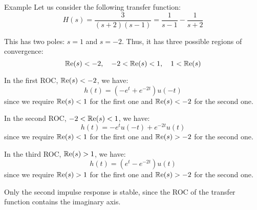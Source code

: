 \documentclass[a4paper]{article}
\begin{document}
\begin{parag}{Example}
    Let us consider the following transfer function: 
    \[H\left(s\right) = \frac{3}{\left(s+2\right)\left(s-1\right)} = \frac{1}{s-1} - \frac{1}{s+2}\]
    
    This has two poles: $s = 1$ and $s = -2$. Thus, it has three possible regions of convergence: 
    \[\cre\left(s\right) < -2, \mathspace -2 < \cre\left(s\right) < 1, \mathspace 1 < \cre\left(s\right)\]

    
    In the first ROC, $\cre\left(s\right) < -2$, we have: 
    \[h\left(t\right) = \left(-e^t + e^{-2t}\right)u\left(-t\right)\]
    since we require $\cre\left(s\right) < 1$ for the first one and $\cre\left(s\right) < -2$ for the second one.

    In the second ROC, $-2 < \cre\left(s\right) < 1$, we have: 
    \[h\left(t\right) = -e^t u\left(-t\right) + e^{-2t}u\left(t\right)\]
    since we require $\cre\left(s\right) < 1$ for the first one and $\cre\left(s\right) > -2$ for the second one.

    In the third ROC, $\cre\left(s\right) > 1$, we have: 
    \[h\left(t\right) = \left(e^t - e^{-2t}\right)u\left(t\right)\]
    since we require $\cre\left(s\right) > 1$ for the first one and $\cre\left(s\right) > -2$ for the second one.
    
    Only the second impulse response is stable, since the ROC of the transfer function contains the imaginary axis.
\end{parag}
\end{document}

